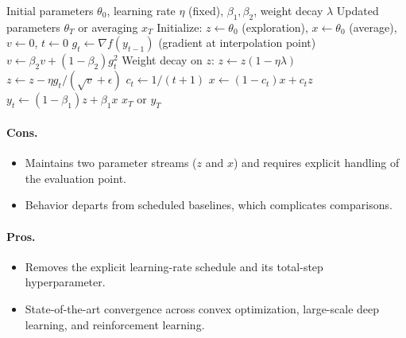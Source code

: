 \begin{algorithm}[H]
\caption{Schedule-Free AdamW}
\label{alg:schedulefree}
\begin{algorithmic}[1]
\Require Initial parameters $\theta_0$, learning rate $\eta$ (fixed), $\beta_1, \beta_2$, weight decay $\lambda$
\Ensure Updated parameters $\theta_T$ or averaging $x_T$
\State Initialize: $z \gets \theta_0$ (exploration), $x \gets \theta_0$ (average), $v \gets 0$, $t \gets 0$
    \State $g_t \gets \nabla f(y_{t-1})$ (gradient at interpolation point)
    \State $v \gets \beta_2 v + (1-\beta_2) g_t^2$ 
    \State Weight decay on $z$: $z \gets z(1 - \eta\lambda)$
    \State $z \gets z - \eta g_t / (\sqrt{v} + \epsilon)$ 
    \State $c_t \gets 1 / (t+1)$ 
    \State $x \gets (1-c_t) x + c_t z$ 
    \State $y_t \gets (1-\beta_1) z + \beta_1 x$ 
\EndFor
\Return $x_T$ or $y_T$
\end{algorithmic}
\end{algorithm}

\paragraph{Cons.}
\begin{itemize}[leftmargin=*]
\item Maintains two parameter streams ($z$ and $x$) and requires explicit handling of the evaluation point.
\item Behavior departs from scheduled baselines, which complicates comparisons.
\end{itemize}

\paragraph{Pros.}
\begin{itemize}[leftmargin=*]
\item Removes the explicit learning-rate schedule and its total-step hyperparameter.
\item State-of-the-art convergence across convex optimization, large-scale deep learning, and reinforcement learning.
\end{itemize}

